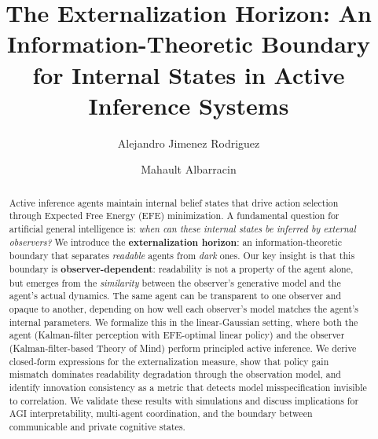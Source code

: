 \documentclass[runningheads]{llncs}
\begin{document}
\title{The Externalization Horizon: An Information-Theoretic Boundary \\
for Internal States in Active Inference Systems}

\author{Alejandro Jimenez Rodriguez \and Mahault Albarracin}



\maketitle

\begin{abstract}
Active inference agents maintain internal belief states that drive action selection through Expected Free Energy (EFE) minimization. A fundamental question for artificial general intelligence is: \emph{when can these internal states be inferred by external observers?} We introduce the \textbf{externalization horizon}: an information-theoretic boundary that separates \emph{readable} agents from \emph{dark} ones. Our key insight is that this boundary is \textbf{observer-dependent}: readability is not a property of the agent alone, but emerges from the \emph{similarity} between the observer's generative model and the agent's actual dynamics. The same agent can be transparent to one observer and opaque to another, depending on how well each observer's model matches the agent's internal parameters. We formalize this in the linear-Gaussian setting, where both the agent (Kalman-filter perception with EFE-optimal linear policy) and the observer (Kalman-filter-based Theory of Mind) perform principled active inference. We derive closed-form expressions for the externalization measure, show that policy gain mismatch dominates readability degradation through the observation model, and identify innovation consistency as a metric that detects model misspecification invisible to correlation. We validate these results with simulations and discuss implications for AGI interpretability, multi-agent coordination, and the boundary between communicable and private cognitive states.
\end{abstract}
\end{document}

